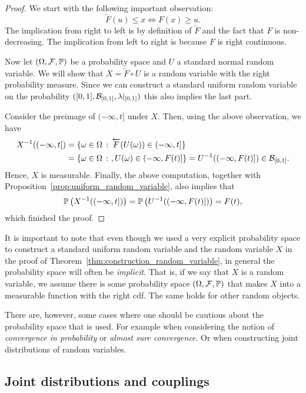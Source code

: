 \begin{proof}
We start with the following important observation: 
\[
	\overleftarrow{F}(u) \le x \iff F(x) \ge u.
\]
The implication from right to left is by definition of $\overleftarrow{F}$ and the fact that $F$ is non-decreasing. The implication from left to right is because $F$ is right continuous.


Now let $(\Omega,\mathcal F, \mathbb P)$ be a probability space and $U$ a standard normal random variable. We will show that $X = \overleftarrow{F} \circ U$ is a random variable with the right probability measure. Since we can construct a standard uniform random variable on the probability $([0,1], \mathcal B_{[0,1]}, \lambda|_{[0,1]})$ this also implies the last part. 

Consider the preimage of $(-\infty, t]$ under $X$. Then, using the above observation, we have
\begin{align*}
	X^{-1}((-\infty,t]) &= \{\omega \in \Omega \, : \, \overleftarrow{F}(U(\omega)) \in (-\infty,t]\}\\
	&= \{\omega \in \Omega \, :\ , U(\omega) \in (-\infty, F(t)]\} = U^{-1}((-\infty, F(t)]) \in \mathcal B_{[0,1]}.
\end{align*}
Hence, $X$ is measurable. Finally, the above computation, together with Proposition~\ref{prop:uniform_random_variable}, also implies that
\[
	\mathbb P\left(X^{-1}((-\infty,t])\right) = \mathbb P\left(U^{-1}((-\infty, F(t)])\right) = F(t),
\]
which finished the proof.
\end{proof}

\begin{remark}
It is important to note that even though we used a very explicit probability space to construct a standard uniform random variable and the random variable $X$ in the proof of Theorem~\ref{thm:construction_random_variable}, in general the probability space will often be \emph{implicit}. That is, if we say that $X$ is a random variable, we assume there is some probability space $(\Omega,\mathcal F, \mathbb P)$ that makes $X$ into a measurable function with the right cdf. The same holds for other random objects.

There are, however, some cases where one should be cautious about the probability space that is used. For example when considering the notion of \emph{convergence in probability} or \emph{almost sure convergence}. Or when constructing joint distributions of random variables. 
\end{remark}


\subsection{Joint distributions and couplings}



